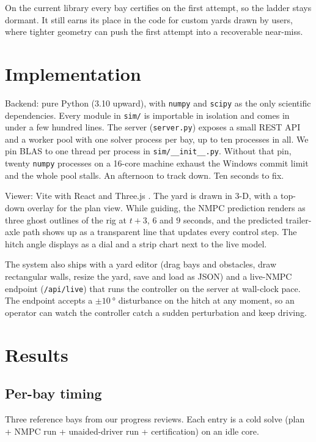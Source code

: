 \documentclass[conference]{IEEEtran}
\begin{document}
On the current library every bay certifies on the first attempt, so the
ladder stays dormant. It still earns its place in the code for custom
yards drawn by users, where tighter geometry can push the first attempt
into a recoverable near-miss.

\section{Implementation}
\label{sec:impl}

Backend: pure Python (3.10 upward), with \texttt{numpy} and \texttt{scipy}
as the only scientific dependencies. Every module in \texttt{sim/} is
importable in isolation and comes in under a few hundred lines. The
server (\texttt{server.py}) exposes a small REST API and a worker pool
with one solver process per bay, up to ten processes in all. We pin BLAS
to one thread per process in \texttt{sim/\_\_init\_\_.py}. Without that
pin, twenty \texttt{numpy} processes on a 16-core machine exhaust the
Windows commit limit and the whole pool stalls. An afternoon to track
down. Ten seconds to fix.

Viewer: Vite \cite{Vite} with React \cite{React} and Three.js
\cite{ThreeJS}. The yard is drawn in 3-D, with a top-down overlay for
the plan view. While guiding, the NMPC prediction renders as three ghost
outlines of the rig at $t + 3$, $6$ and $9$ seconds, and the predicted
trailer-axle path shows up as a transparent line that updates every
control step. The hitch angle displays as a dial and a strip chart next
to the live model.

The system also ships with a yard editor (drag bays and obstacles, draw
rectangular walls, resize the yard, save and load as JSON) and a
live-NMPC endpoint (\texttt{/api/live}) that runs the controller on the
server at wall-clock pace. The endpoint accepts a
$\pm \SI{10}{\degree}$ disturbance on the hitch at any moment, so an
operator can watch the controller catch a sudden perturbation and keep
driving.

\section{Results}
\label{sec:results}

\subsection{Per-bay timing}

Three reference bays from our progress reviews. Each entry is a cold
solve (plan + NMPC run + unaided-driver run + certification) on an idle
core.
\end{document}
